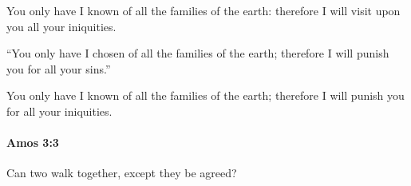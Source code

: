 			\begin{versebox}
					\item[BHS] 
					\item[LXX] 
					\item[ASV] You only have I known of all the families of the earth: therefore I will visit upon you all your iniquities.
					\item[NIV] “You only have I chosen of all the families of the earth; therefore I will punish you for all your sins.”
					\item[NRSV] You only have I known of all the families of the earth; therefore I will punish you for all your iniquities.
			\end{versebox}

		\paragraph{Amos 3:3} %
			\label{AMOS-3-3}

			Can two walk together, except they be agreed?

